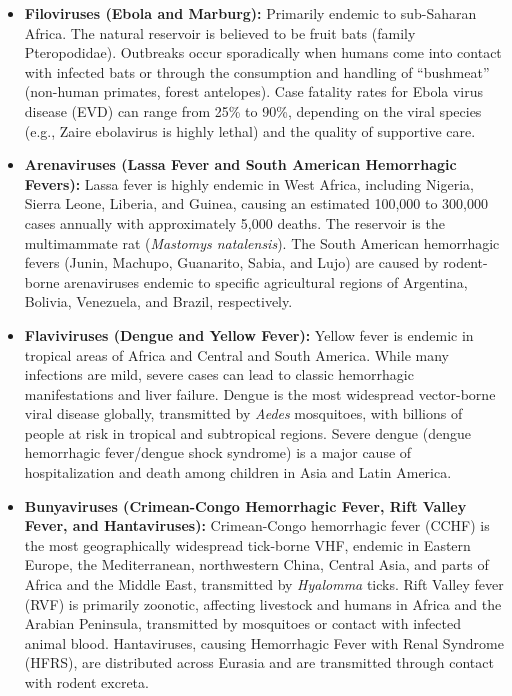 \begin{itemize}
\item \textbf{Filoviruses (Ebola and Marburg):} Primarily endemic to sub-Saharan Africa. The natural reservoir is believed to be fruit bats (family Pteropodidae). Outbreaks occur sporadically when humans come into contact with infected bats or through the consumption and handling of ``bushmeat'' (non-human primates, forest antelopes). Case fatality rates for Ebola virus disease (EVD) can range from 25\% to 90\%, depending on the viral species (e.g., Zaire ebolavirus is highly lethal) and the quality of supportive care.
\item \textbf{Arenaviruses (Lassa Fever and South American Hemorrhagic Fevers):} Lassa fever is highly endemic in West Africa, including Nigeria, Sierra Leone, Liberia, and Guinea, causing an estimated 100,000 to 300,000 cases annually with approximately 5,000 deaths. The reservoir is the multimammate rat (\textit{Mastomys natalensis}). The South American hemorrhagic fevers (Junin, Machupo, Guanarito, Sabia, and Lujo) are caused by rodent-borne arenaviruses endemic to specific agricultural regions of Argentina, Bolivia, Venezuela, and Brazil, respectively.
\item \textbf{Flaviviruses (Dengue and Yellow Fever):} Yellow fever is endemic in tropical areas of Africa and Central and South America. While many infections are mild, severe cases can lead to classic hemorrhagic manifestations and liver failure. Dengue is the most widespread vector-borne viral disease globally, transmitted by \textit{Aedes} mosquitoes, with billions of people at risk in tropical and subtropical regions. Severe dengue (dengue hemorrhagic fever/dengue shock syndrome) is a major cause of hospitalization and death among children in Asia and Latin America.
\item \textbf{Bunyaviruses (Crimean-Congo Hemorrhagic Fever, Rift Valley Fever, and Hantaviruses):} Crimean-Congo hemorrhagic fever (CCHF) is the most geographically widespread tick-borne VHF, endemic in Eastern Europe, the Mediterranean, northwestern China, Central Asia, and parts of Africa and the Middle East, transmitted by \textit{Hyalomma} ticks. Rift Valley fever (RVF) is primarily zoonotic, affecting livestock and humans in Africa and the Arabian Peninsula, transmitted by mosquitoes or contact with infected animal blood. Hantaviruses, causing Hemorrhagic Fever with Renal Syndrome (HFRS), are distributed across Eurasia and are transmitted through contact with rodent excreta.
\end{itemize}

